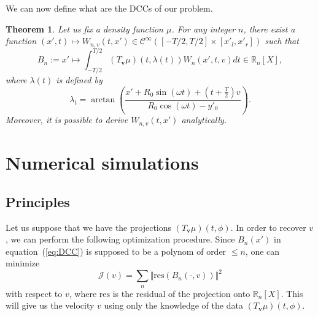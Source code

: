 \documentclass[9pt,technote]{IEEEtran}
\numberwithin{equation}{section}
\newcommand{\R}{\mathbb{R}}
\newcommand{\RnX}{\mathbb{R}_n[X]}
\newcommand{\Cinf}{\mathcal{C}^{\infty}}
\newcommand{\Tbv}{T_{\mathbf{v}}}
\newtheorem{theorem}{Theorem}
\begin{document}
We can now define what are the DCCs of our problem.
\begin{theorem}
Let us fix a density function $\mu$. For any integer $n$, there exist a function $(x',t)\mapsto W_{n,v}(t,x') \in \Cinf \left( [-T/2,T/2] \times [x'_l,x'_r] \right)$ such that
\begin{equation}
	B_n := x' \mapsto \int_{-T/2}^{T/2} \left( \Tbv \mu \right)\left( t,\lambda(t) \right) W_n(x',t,v) dt \in \RnX,
\label{eq:DCC}
\end{equation}
where $\lambda(t)$ is defined by
\begin{equation}
	\lambda_t = \arctan \left( \frac{x' + R_0 \sin(\omega t) + \left( t + \frac{T}{2} \right)v}{R_0 \cos(\omega t) - y'_0} \right).
\end{equation}
Moreover, it is possible to derive $W_{n,v}(t,x')$ analytically.
\end{theorem}

\section{Numerical simulations}

\subsection{Principles}
\label{sub:principles}
Let us suppose that we have the projections $\left( \Tbv \mu \right)(t,\phi)$. In order to recover $v$, we can perform the following optimization procedure. Since $B_n(x')$ in equation~(\ref{eq:DCC}) is supposed to be a polynom of order $\leq n$, one can minimize
\begin{equation}
	\mathcal{J}(v) = \sum_n \Vert \textrm{res} \left( B_n(\cdot,v) \right) \Vert^2
\end{equation}
with respect to $v$, where $\textrm{res}$ is the residual of the projection onto $\R_n[X]$. This will give us the velocity $v$ using only the knowledge of the data $\left( \Tbv \mu \right)(t,\phi)$.
\end{document}
